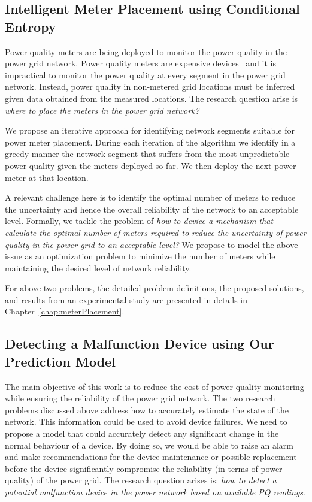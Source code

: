 \subsection{Intelligent Meter Placement using Conditional Entropy}
Power quality meters are being deployed to monitor the power quality in the power grid network. Power quality meters are expensive devices~\cite{fluke_meter, schneider_meter} and it is impractical to monitor the power quality at every segment in the power grid network. Instead, power quality in non-metered grid locations must be inferred given data obtained from the measured locations. The research question arise is \textit{where to place the meters in the power grid network?}
	
We propose an iterative approach for identifying network segments suitable for power meter placement. During each iteration of the algorithm we identify in a greedy manner the network segment that suffers from the most unpredictable power quality given the meters deployed so far. We then deploy the next power meter at that location.

A relevant challenge here is to identify the optimal number of meters to reduce the uncertainty and hence the overall reliability of the network to an acceptable level. Formally, we tackle the problem of \textit{how to device a mechanism that calculate the optimal number of meters required to reduce the uncertainty of power quality in the power grid to an acceptable level?} We propose to model the above issue as an optimization problem to minimize the number of meters while maintaining the desired level of network reliability.

For above two problems, the detailed problem definitions, the proposed solutions, and results from an experimental study are presented in details in Chapter~\ref{chap:meterPlacement}.

\subsection{Detecting a Malfunction Device using Our Prediction Model}
The main objective of this work is to reduce the cost of power quality monitoring while ensuring the reliability of the power grid network. The two research problems discussed above address how to accurately estimate the state of the network. This information could be used to avoid device failures. We need to propose a model that could accurately detect any significant change in the normal behaviour of a device. By doing so, we would be able to raise an alarm and make recommendations for the device maintenance or possible replacement before the device significantly compromise the reliability (in terms of power quality) of the power grid. The research question arises is: \textit{how to detect a potential malfunction device in the power network based on available PQ readings}.

